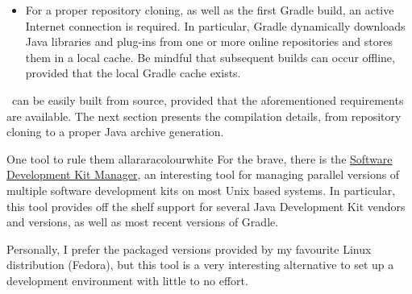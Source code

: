 \begin{itemize}[label={}]

Please refer to the Gradle \href{https://gradle.org}{project website} in order to obtain specific installation instructions for your operating system. In general, most recent Linux distributions have the Gradle binary, as well the proper associated dependencies, available in their corresponding repositories.

\item For a proper repository cloning, as well as the first Gradle build, an active Internet connection is required. In particular, Gradle dynamically downloads Java libraries and plug-ins from one or more online repositories and stores them in a local cache. Be mindful that subsequent builds can occur offline, provided that the local Gradle cache exists.
\end{itemize}

\arara\ can be easily built from source, provided that the aforementioned requirements are available. The next section presents the compilation details, from repository cloning to a proper Java archive generation.

\begin{messagebox}{One tool to rule them all}{araracolour}{\icok}{white}
\setlength{\parskip}{1em}
For the brave, there is the \href{https://sdkman.io/}{Software Development Kit Manager}, an interesting tool for managing parallel versions of multiple software development kits on most Unix based systems. In particular, this tool provides off the shelf support for several Java Development Kit vendors and versions, as well as most recent versions of Gradle.

Personally, I prefer the packaged versions provided by my favourite Linux distribution (Fedora), but this tool is a very interesting alternative to set up a development environment with little to no effort.
\end{messagebox}

